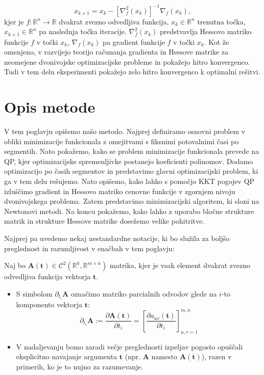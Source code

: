 \documentclass[mat2, tisk]{fmfdelo}
\begin{document}
\begin{equation}
    x_{k+1} = x_k - [\nabla^2_f(x_k)]^{-1} \nabla_f(x_k), 
\end{equation}
kjer je $f : \mathbb{R}^n \to \mathbb{R}$ dvakrat zvezno odvedljiva funkcija, $x_k \in \mathbb{R}^n$ trenutna točka, $x_{k+1} \in \mathbb{R}^n$ pa naslednja točka iteracije. $\nabla^2_f(x_k)$ predstvavlja Hessovo matriko funkcije $f$ v točki $x_k$, $\nabla_f(x_k)$ pa gradient funkcije $f$ v točki $x_k$. Kot že omenjeno, v \cite{dyro2022second} razvijejo teorijo računanja gradienta in Hessove matrike za neomejene dvonivojske optimizacijske probleme in pokažejo hitro konvergenco. Tudi v tem delu eksperimenti pokažejo zelo hitro konvergenco k optimalni rešitvi.

\section{Opis metode}
\label{sec:opis_metode}

V tem poglavju opišemo našo metodo. Najprej definiramo osnovni problem v obliki minimizacije funkcionala z omejitvami s fiksnimi potovalnimi časi po segmentih. Nato pokažemo, kako se problem minimizacije funkcionala prevede na QP, kjer optimizacijske spremenljivke postanejo koeficienti polinomov. Dodamo optimizacijo po časih segmentov in predstavimo glavni optimizacijski problem, ki ga v tem delu rešujemo. Nato opišemo, kako lahko s pomočjo KKT pogojev QP izluščimo gradient in Hessovo matriko cenovne funkcije v zgornjem nivoju dvonivojskega problema. Zatem predstavimo minimizacijski algoritem, ki sloni na Newtonovi metodi. Na koncu pokažemo, kako lahko z uporabo bločne strukture matrik in strukture Hessove matrike dosežemo velike pohitritve. 

Najprej pa uvedemo nekaj nestandardne notacije, ki bo služila za boljšo preglednost in razumljivost v enačbah v tem poglavju:

Naj bo $\mathbf{A}(\mathbf{t}) \in \mathcal{C}^2(\mathbb{R}^k, \mathbb{R}^{m\times n})$ matrika, kjer je vsak element dvakrat zvezno odvedljiva funkcija vektorja $\mathbf{t}$.
\begin{itemize}
    \item S simbolom $\partial_{t_i} \mathbf{A}$ označimo matriko parcialnih odvodov glede na $i$-to komponento vektorja $\mathbf{t}$:
    \begin{equation} \partial_{t_i} \mathbf{A} := \frac{\partial \mathbf{A}(\mathbf{t})}{\partial t_i} = \left[ \frac{\partial a_{uv}(\mathbf{t})}{\partial t_i} \right]_{u,v=1}^{m,n} \end{equation}
    \item V nadaljevanju bomo zaradi večje preglednosti izpeljav pogosto opuščali eksplicitno navajanje argumenta $\mathbf{t}$ (npr. $\mathbf{A}$ namesto $\mathbf{A}(\mathbf{t})$), razen v primerih, ko je to nujno za razumevanje.
\end{itemize}
\end{document}
